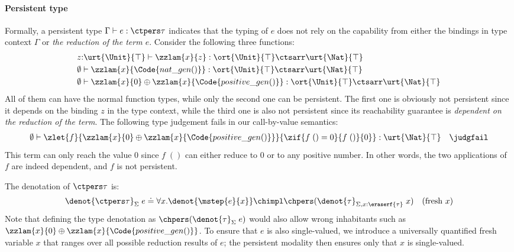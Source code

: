 \paragraph{Persistent type} Formally, a persistent type $\Gamma \vdash e : \ctpers \tau$ indicates that the typing of $e$ does not rely on the capability from either the bindings in type context $\Gamma$ or \emph{the reduction of the term $e$}. Consider the following three functions:
\begin{align*}
  &z{:}\urt{\Unit}{\top} \vdash \zzlam{x}{z} : \ort{\Unit}{\top} \ctsarr \urt{\Nat}{\top}
  \\&\emptyset \vdash \zzlam{x}{\Code{nat\_gen()}} : \ort{\Unit}{\top} \ctsarr \urt{\Nat}{\top}
  \\&\emptyset \vdash \zzlam{x}{0} \oplus \zzlam{x}{\Code{positive\_gen()}} : \ort{\Unit}{\top} \ctsarr \urt{\Nat}{\top}
\end{align*}\noindent
All of them can have the normal function types, while only the second one can be persistent. The first one is obviously not persistent since it depends on the binding $z$ in the type context, while the third one is also not persistent since its reachability guarantee is \emph{dependent on the reduction of the term}. The following type judgement fails in our call-by-value semantics:
\begin{align*}
  \emptyset \vdash \zlet{f}{\zzlam{x}{0} \oplus \zzlam{x}{\Code{positive\_gen()}}}{\zif{f\;() = 0}{f\;()}{0}} : \urt{\Nat}{\top} \quad \judgfail
\end{align*}\noindent
This term can only reach the value $0$ since $f\;()$ can either reduce to $0$ or to any positive number. In other words, the two applications of $f$ are indeed dependent, and $f$ is not persistent.

\begin{definition}
  The denotation of $\ctpers \tau$ is:
  \begin{align*}
    \denot{\ctpers \tau}_\Sigma\;e \doteq \forall x.\denot{\mstep{e}{x}} \chimpl \chpers (\denot{\tau}_{\Sigma,x{:}\eraserf{\tau}}\;x) \quad (\text{fresh $x$})
  \end{align*}\noindent 
Note that defining the type denotation as $\chpers (\denot{\tau}_{\Sigma}\;e)$ would also allow wrong inhabitants such as $\zzlam{x}{0} \oplus \zzlam{x}{\Code{positive\_gen()}}$. To ensure that $e$ is also single-valued, we introduce a universally quantified fresh variable $x$ that ranges over all possible reduction results of $e$; the persistent modality then ensures only that $x$ is single-valued.
\end{definition}

